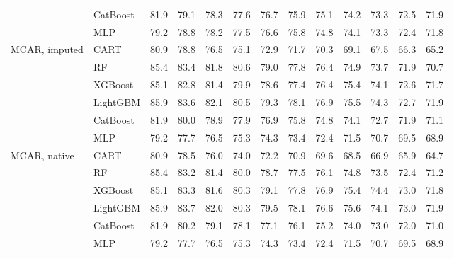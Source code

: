 \begin{table}[p]
\begin{tabular}{@{}llrrrrrrrrrrr@{}}
 & CatBoost & 81.9 & 79.1 & 78.3 & 77.6 & 76.7 & 75.9 & 75.1 & 74.2 & 73.3 & 72.5 & 71.9 \\
 & MLP & 79.2 & 78.8 & 78.2 & 77.5 & 76.6 & 75.8 & 74.8 & 74.1 & 73.3 & 72.4 & 71.8 \\
\midrule
MCAR, imputed & CART & 80.9 & 78.8 & 76.5 & 75.1 & 72.9 & 71.7 & 70.3 & 69.1 & 67.5 & 66.3 & 65.2 \\
 & RF & 85.4 & 83.4 & 81.8 & 80.6 & 79.0 & 77.8 & 76.4 & 74.9 & 73.7 & 71.9 & 70.7 \\
 & XGBoost & 85.1 & 82.8 & 81.4 & 79.9 & 78.6 & 77.4 & 76.4 & 75.4 & 74.1 & 72.6 & 71.7 \\
 & LightGBM & 85.9 & 83.6 & 82.1 & 80.5 & 79.3 & 78.1 & 76.9 & 75.5 & 74.3 & 72.7 & 71.9 \\
 & CatBoost & 81.9 & 80.0 & 78.9 & 77.9 & 76.9 & 75.8 & 74.8 & 74.1 & 72.7 & 71.9 & 71.1 \\
 & MLP & 79.2 & 77.7 & 76.5 & 75.3 & 74.3 & 73.4 & 72.4 & 71.5 & 70.7 & 69.5 & 68.9 \\
\midrule
MCAR, native & CART & 80.9 & 78.5 & 76.0 & 74.0 & 72.2 & 70.9 & 69.6 & 68.5 & 66.9 & 65.9 & 64.7 \\
 & RF & 85.4 & 83.2 & 81.4 & 80.0 & 78.7 & 77.5 & 76.1 & 74.8 & 73.5 & 72.4 & 71.2 \\
 & XGBoost & 85.1 & 83.3 & 81.6 & 80.3 & 79.1 & 77.8 & 76.9 & 75.4 & 74.4 & 73.0 & 71.8 \\
 & LightGBM & 85.9 & 83.7 & 82.0 & 80.3 & 79.5 & 78.1 & 76.6 & 75.6 & 74.1 & 73.0 & 71.9 \\
 & CatBoost & 81.9 & 80.2 & 79.1 & 78.1 & 77.1 & 76.1 & 75.2 & 74.0 & 73.0 & 72.0 & 71.0 \\
 & MLP & 79.2 & 77.7 & 76.5 & 75.3 & 74.3 & 73.4 & 72.4 & 71.5 & 70.7 & 69.5 & 68.9 \\
\bottomrule
\end{tabular}
\end{table}

